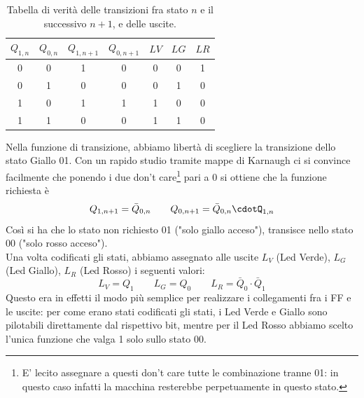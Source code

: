 \documentclass[10pt,a4paper]{article}
\begin{document}
\begin{table}[!htb]
\centering
\begin{tabular}{|c|c||c|c||c|c|c|}
\hline
$Q_{1,n}$ & $Q_{0,n}$ & $Q_{1,n+1}$ & $Q_{0,n+1}$ & $LV$ & $LG$ & $LR$\\
\hline
0 & 0 & 1 & 0 & 0 & 0 & 1 \\
0 & 1 & 0 & 0 & 0 & 1 & 0\\
1 & 0 & 1 & 1 & 1 & 0 & 0\\
1 & 1 & 0 & 0 & 1 & 1 & 0\\
\hline
\end{tabular}
\caption{Tabella di verità delle transizioni fra stato $n$ e il successivo $n+1$, e delle uscite.\label{tab:transizioneenabled}}
\end{table}

Nella funzione di transizione, abbiamo libertà di scegliere la transizione dello stato Giallo 01.
Con un rapido studio tramite mappe di Karnaugh ci si convince facilmente che ponendo i due don't care\footnote{E' lecito assegnare a questi don't care tutte le combinazione tranne 01: in questo caso infatti la macchina resterebbe perpetuamente in questo stato.} pari a 0 si ottiene che la funzione richiesta è \begin{equation}
Q_{1, n+1} = \bar{Q}_{0,n}\qquad Q_{0,n+1} = \bar{Q}_{0,n}\cdotQ_{1,n} 
\end{equation}
Così si ha che lo stato non richiesto 01 ("solo giallo acceso"), transisce nello stato 00 ("solo rosso acceso").\\
Una volta codificati gli stati, abbiamo assegnato alle uscite $L_V$ (Led Verde), $L_G$ (Led Giallo), $L_R$ (Led Rosso) i seguenti valori:
\begin{equation}
L_V = Q_1 \qquad L_G = Q_0 \qquad L_R = \bar{Q}_0\cdot \bar{Q}_1
\end{equation}
Questo era in effetti il modo più semplice per realizzare i collegamenti fra i FF e le uscite: per come erano stati codificati gli stati, i Led Verde e Giallo sono pilotabili direttamente dal rispettivo bit, mentre per il Led Rosso abbiamo scelto l'unica funzione che valga 1 solo sullo stato 00. %
\end{document}
